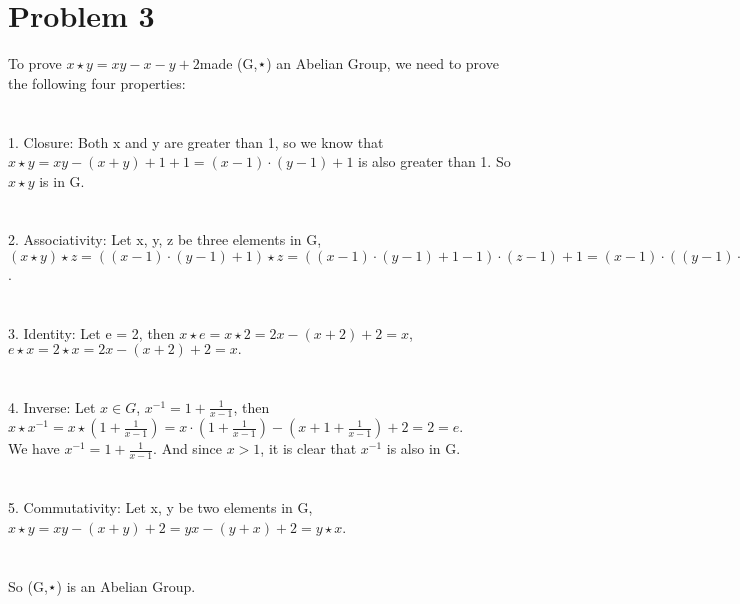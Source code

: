 \documentclass{article}
\begin{document}
\section{Problem 3}
To prove $x \star y = xy − x − y + 2 $made (G,⋆) an Abelian Group, we need to prove the following four properties:\\
\\ \hspace*{\fill} \\
1. Closure: Both x and y are greater than 1, so we know that $ x \star y = xy - (x + y) + 1 + 1 = (x - 1) \cdot (y - 1) + 1$ is also greater than 1. So $x \star y $ is in G.\\ 
\\ \hspace*{\fill} \\
2. Associativity: Let x, y, z be three elements in G, $(x \star y) \star z = ((x - 1) \cdot (y - 1) + 1) \star z = ((x - 1) \cdot (y - 1) + 1 - 1) \cdot (z - 1) + 1 = (x - 1) \cdot ((y - 1) \cdot (z - 1) + 1 - 1) + 1  = x \star (y \star z)$.\\
\\ \hspace*{\fill} \\
3. Identity: Let e = 2, then $x \star e = x \star 2 = 2x - (x + 2) + 2 = x$, $ e \star x = 2 \star x = 2x - (x+2) + 2 = x.$\\
\\ \hspace*{\fill} \\
4. Inverse: Let $x \in G$, $ x^{-1} = 1 + \frac{1}{x-1}$, then $x \star x^{-1} = x \star (1 + \frac{1}{x-1}) = x \cdot (1 + \frac{1}{x-1}) - (x + 1 + \frac{1}{x-1}) + 2 = 2 = e $.\\
We have $x^{-1} = 1 + \frac{1}{x-1}$. And since $x > 1$, it is clear that $x^{-1}$ is also in G.\\
\\ \hspace*{\fill} \\
5. Commutativity: Let x, y be two elements in G, $x \star y = xy - (x + y) + 2 = yx - (y + x) + 2 = y \star x$.\\
\\ \hspace*{\fill} \\
So (G,⋆) is an Abelian Group.\\
\\ \hspace*{\fill} \\
\newpage
\end{document}

